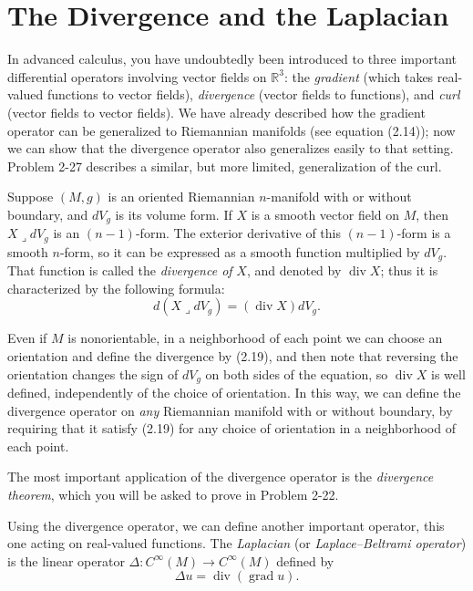 \section{The Divergence and the Laplacian}

In advanced calculus, you have undoubtedly been introduced to three important
differential operators involving vector fields on $\mathbb{R}^3$: the \emph{gradient} (which takes real-valued functions to vector fields), \emph{divergence} (vector fields to functions), and \emph{curl}
(vector fields to vector fields). We have already described how the gradient operator
can be generalized to Riemannian manifolds (see equation (2.14)); now we can show
that the divergence operator also generalizes easily to that setting. Problem 2-27
describes a similar, but more limited, generalization of the curl.

Suppose $(M, g)$ is an oriented Riemannian $n$-manifold with or without boundary,
and $dV_g$ is its volume form. If $X$ is a smooth vector field on $M$, then $X \lrcorner dV_g$ is
an $(n-1)$-form. The exterior derivative of this $(n-1)$-form is a smooth $n$-form, so
it can be expressed as a smooth function multiplied by $dV_g$. That function is called
the \emph{divergence of } $X$, and denoted by $\operatorname{div} X$; thus it is characterized by the following
formula:
\begin{equation}
d(X \lrcorner dV_g) = (\operatorname{div} X)dV_g. \tag{2.19}
\end{equation}

Even if $M$ is nonorientable, in a neighborhood of each point we can choose an
orientation and define the divergence by (2.19), and then note that reversing the orientation changes the sign of $dV_g$ on both sides of the equation, so $\operatorname{div} X$ is well
defined, independently of the choice of orientation. In this way, we can define the
divergence operator on \emph{any} Riemannian manifold with or without boundary, by
requiring that it satisfy (2.19) for any choice of orientation in a neighborhood of
each point.

The most important application of the divergence operator is the \emph{divergence theorem}, which you will be asked to prove in Problem 2-22.

Using the divergence operator, we can define another important operator, this one
acting on real-valued functions. The \emph{Laplacian} (or \emph{Laplace--Beltrami operator}) is
the linear operator $\Delta: C^\infty(M) \to C^\infty(M)$ defined by
\begin{equation}
\Delta u = \operatorname{div}(\operatorname{grad} u). \tag{2.20}
\end{equation}

